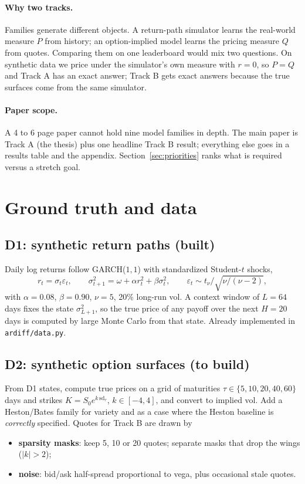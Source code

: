 \documentclass[10pt]{article}
\begin{document}
\paragraph{Why two tracks.} Families generate different objects. A return-path simulator learns the
real-world measure $P$ from history; an option-implied model learns the pricing measure $Q$ from quotes.
Comparing them on one leaderboard would mix two questions. On synthetic data we price under the simulator's
own measure with $r=0$, so $P=Q$ and Track A has an exact answer; Track B gets exact answers because the true
surfaces come from the same simulator.

\paragraph{Paper scope.} A 4 to 6 page paper cannot hold nine model families in depth. The main paper is Track A
(the thesis) plus one headline Track B result; everything else goes in a results table and the appendix.
Section~\ref{sec:priorities} ranks what is required versus a stretch goal.

\section{Ground truth and data}

\subsection{D1: synthetic return paths (built)}
Daily log returns follow GARCH($1,1$) with standardized Student-$t$ shocks,
\[
r_t=\sigma_t\varepsilon_t,\qquad \sigma_{t+1}^2=\omega+\alpha r_t^2+\beta\sigma_t^2,\qquad
\varepsilon_t\sim t_\nu/\sqrt{\nu/(\nu-2)},
\]
with $\alpha=0.08$, $\beta=0.90$, $\nu=5$, 20\% long-run vol. A context window of $L=64$ days fixes the state
$\sigma^2_{L+1}$, so the true price of any payoff over the next $H=20$ days is computed by large Monte Carlo
from that state. Already implemented in \texttt{ardiff/data.py}.

\subsection{D2: synthetic option surfaces (to build)}
From D1 states, compute true prices on a grid of maturities $\tau\in\{5,10,20,40,60\}$ days and strikes
$K=S_0e^{k\,\mathrm{sd}_\tau}$, $k\in[-4,4]$, and convert to implied vol. Add a Heston/Bates family for variety
and as a case where the Heston baseline is \emph{correctly} specified. Quotes for Track B are drawn by
\begin{itemize}
\item \textbf{sparsity masks}: keep 5, 10 or 20 quotes; separate masks that drop the wings ($|k|>2$);
\item \textbf{noise}: bid/ask half-spread proportional to vega, plus occasional stale quotes.
\end{itemize}
\end{document}
